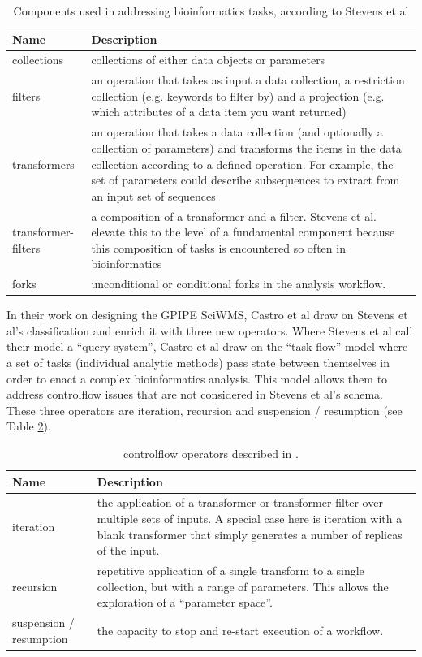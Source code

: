\documentclass[a4paper,10pt]{scrreprt}
\begin{document}
\begin{table}[h]
\begin{tabular}{|l|p{7cm}|}
\hline \textbf{Name} & \textbf{Description} \\
\hline collections & collections of either data objects or parameters \\
\hline filters & an operation that takes as input a data collection, a restriction collection (e.g. keywords to filter by) and a projection (e.g. which attributes of a data item you want returned) \\
\hline transformers & an operation that takes a data collection (and optionally a collection of parameters) and transforms the items in the data collection according to a defined operation. For example, the set of parameters could describe subsequences to extract from an input set of sequences \\
\hline transformer-filters & a composition of a transformer and a filter. Stevens et al. elevate this to the level of a fundamental component because this composition of tasks is encountered so often in bioinformatics \\
\hline forks & unconditional or conditional forks in the analysis workflow. \\
\hline
\end{tabular} 
\caption{Components used in addressing bioinformatics tasks, according to Stevens et al \protect\cite{stevens_classification_2001}}
\label{tab:stevenscomponents} 
\end{table}

In their work on designing the GPIPE \gls{SciWMS}, Castro et al \cite{castro_workflows_2005} draw on
Stevens et al's classification and enrich it with three new operators. Where Stevens et al call their 
model a ``query system'', Castro et al draw on the ``task-flow'' model where a set of tasks 
(individual analytic methods) pass state between themselves in order to enact a complex 
bioinformatics analysis. This model allows them to address \gls{controlflow} issues that are not
considered in Stevens et al's schema. These three operators are iteration, recursion and 
suspension / resumption (see Table \ref{tab:castrocomponents}).

\begin{table}[h]
\begin{tabular}{|l|p{7cm}|}
\hline \textbf{Name} & \textbf{Description} \\
\hline iteration & the application of a transformer or transformer-filter over multiple sets of inputs. A special case here is iteration with a blank transformer that simply generates a number of replicas of the input. \\
\hline recursion & repetitive application of a single transform to a single collection, but with a range of parameters. This allows the exploration of a ``parameter space''. \\
\hline suspension / resumption & the capacity to stop and re-start execution of a workflow. \\
\hline
\end{tabular}
\caption{\protect\Gls{controlflow} operators described in \cite{castro_workflows_2005}. }
\label{tab:castrocomponents} 
\end{table}
\end{document}
